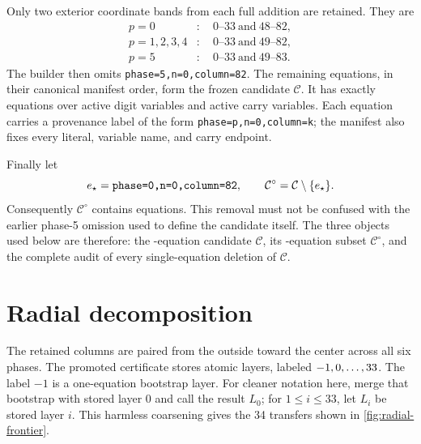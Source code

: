 \documentclass[11pt,twoside]{article}
\theoremstyle{remark}
\newcommand{\Candidate}{\ensuremath{\mathcal{C}}}
\newcommand{\Core}{\ensuremath{\mathcal{C}^{\circ}}}
\begin{document}
Only two exterior coordinate bands from each full addition are retained.
They are
\begin{align*}
  p=0 &: \quad 0\text{--}33 \ \text{and}\ 48\text{--}82,\\
  p=1,2,3,4 &: \quad 0\text{--}33 \ \text{and}\ 49\text{--}82,\\
  p=5 &: \quad 0\text{--}33 \ \text{and}\ 49\text{--}83.
\end{align*}
The builder then omits \texttt{phase=5,n=0,column=82}.  The remaining
equations, in their canonical manifest order, form the frozen candidate
$\Candidate$.  It has exactly \CandidateEquationCount{} equations over
\ActiveDigitCount{} active digit variables and \ActiveCarryCount{} active
carry variables.  Each equation carries a provenance label of the form
\texttt{phase=p,n=0,column=k}; the manifest also fixes every literal,
variable name, and carry endpoint.

Finally let
\[
  e_\star=\text{\RemovedCoreEquation},
  \qquad
  \Core=\Candidate\setminus\{e_\star\}.
\]
Consequently $\Core$ contains \CoreEquationCount{} equations.  This removal
must not be confused with the earlier phase-5 omission used to define the
candidate itself.  The three objects used below are therefore: the
\CandidateEquationCount-equation candidate $\Candidate$, its
\CoreEquationCount-equation subset $\Core$, and the complete audit of every
single-equation deletion of $\Candidate$.

\section{Radial decomposition}
\label{sec:radial-decomposition}

The retained columns are paired from the outside toward the center across all
six phases.  The promoted certificate stores \RadialLayerCount{} atomic
layers, labeled $-1,0,\ldots,33$.  The label $-1$ is a
one-equation bootstrap layer.  For cleaner notation here, merge that
bootstrap with stored layer $0$ and call the result $L_0$; for
$1\leq i\leq 33$, let $L_i$ be stored layer $i$.  This harmless coarsening
gives the 34 transfers shown in \cref{fig:radial-frontier}.
\end{document}
